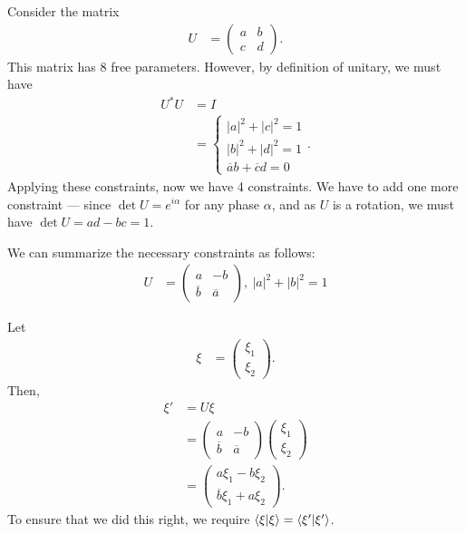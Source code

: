 \documentclass[10pt]{mypackage}
\begin{document}
\begin{example}[Rotations in $\C^2$]
Consider the matrix
\begin{align*}
  U &= \begin{pmatrix}a & b \\ c & d\end{pmatrix}.
\end{align*}
This matrix has 8 free parameters. However, by definition of unitary, we must have
\begin{align*}
  U^{\ast}U &= I\\
            &= \begin{cases}
              \left\vert a \right\vert^2 + \left\vert c \right\vert^2 = 1\\
              \left\vert b \right\vert^2 + \left\vert d \right\vert^2 = 1\\
              \overline{a}b + \overline{c}d = 0
            \end{cases}.
\end{align*}
Applying these constraints, now we have 4 constraints. We have to add one more constraint --- since $\det U = e^{i\alpha}$ for any phase $\alpha$, and as $U$ is a rotation, we must have $\det U = ad-bc = 1$.\newline

We can summarize the necessary constraints as follows:
\begin{align*}
  U &= \begin{pmatrix} a & -b \\ \overline{b} & \overline{a}\end{pmatrix},~\left\vert a \right\vert^2 + \left\vert b \right\vert^2 = 1
\end{align*}
\end{example}
\begin{example}
  Let
  \begin{align*}
    \xi &= \begin{pmatrix}\xi_1 \\ \xi_2\end{pmatrix}.
  \end{align*}
  Then,
  \begin{align*}
    \xi' &= U\xi\\
         &= \begin{pmatrix}a & -b \\ \overline{b} & \overline{a}\end{pmatrix} \begin{pmatrix}\xi_1 \\ \xi_2\end{pmatrix}\\
         &= \begin{pmatrix}a\xi_1 - b\xi_2 \\ \overline{b}\xi_1 + a\xi_2 \end{pmatrix}.
  \end{align*}
  To ensure that we did this right, we require $\braket{\xi}{\xi} = \braket{\xi'}{\xi'}$.
\end{example}
\end{document}
